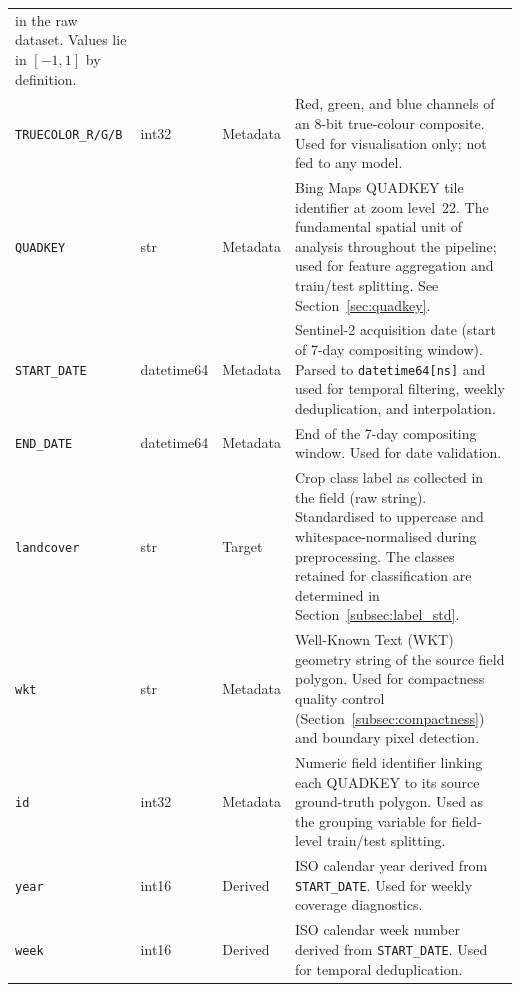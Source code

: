 \begin{longtable}{@{}p{2.6cm}p{1.4cm}p{1.6cm}p{7.4cm}@{}}
    in the raw dataset. Values lie in $[-1, 1]$ by definition. \\
\addlinespace
\texttt{TRUECOLOR\_R/G/B} & int32 & Metadata &
    Red, green, and blue channels of an 8-bit true-colour composite.
    Used for visualisation only; not fed to any model. \\
\addlinespace
\texttt{QUADKEY} & str & Metadata &
    Bing Maps QUADKEY tile identifier at zoom level~22. The fundamental
    spatial unit of analysis throughout the pipeline; used for feature
    aggregation and train/test splitting. See Section~\ref{sec:quadkey}. \\
\addlinespace
\texttt{START\_DATE} & datetime64 & Metadata &
    Sentinel-2 acquisition date (start of 7-day compositing window).
    Parsed to \texttt{datetime64[ns]} and used for temporal filtering,
    weekly deduplication, and interpolation. \\
\addlinespace
\texttt{END\_DATE} & datetime64 & Metadata &
    End of the 7-day compositing window. Used for date validation. \\
\addlinespace
\texttt{landcover} & str & Target &
    Crop class label as collected in the field (raw string). Standardised
    to uppercase and whitespace-normalised during preprocessing. The
    classes retained for classification are determined in
    Section~\ref{subsec:label_std}. \\
\addlinespace
\texttt{wkt} & str & Metadata &
    Well-Known Text (WKT) geometry string of the source field polygon.
    Used for compactness quality control
    (Section~\ref{subsec:compactness}) and boundary pixel detection. \\
\addlinespace
\texttt{id} & int32 & Metadata &
    Numeric field identifier linking each QUADKEY to its source
    ground-truth polygon. Used as the grouping variable for field-level
    train/test splitting. \\
\addlinespace
\texttt{year} & int16 & Derived &
    ISO calendar year derived from \texttt{START\_DATE}. Used for
    weekly coverage diagnostics. \\
\addlinespace
\texttt{week} & int16 & Derived &
    ISO calendar week number derived from \texttt{START\_DATE}. Used
    for temporal deduplication. \\
\end{longtable}
\normalsize

